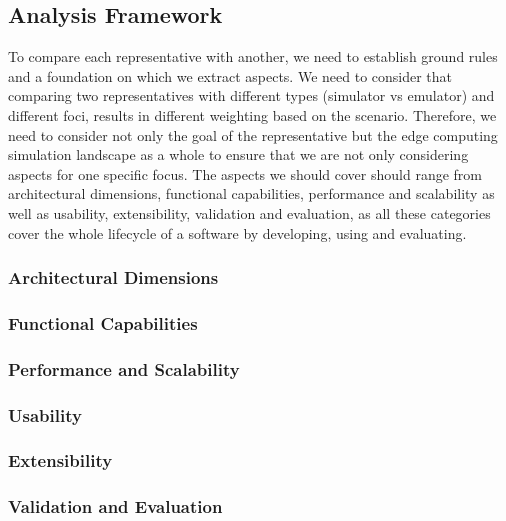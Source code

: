\subsection{Analysis Framework}
To compare each representative with another, we need to establish ground rules and a foundation on which we extract aspects.
We need to consider that comparing two representatives with different types (simulator vs emulator) and different foci, results in different weighting based on the scenario.
Therefore, we need to consider not only the goal of the representative but the edge computing simulation landscape as a whole to ensure that we are not only considering aspects for one specific focus.
The aspects we should cover should range from architectural dimensions, functional capabilities, performance and scalability as well as usability, extensibility, validation and evaluation,
as all these categories cover the whole lifecycle of a software by developing, using and evaluating.

\subsubsection{Architectural Dimensions}

\subsubsection{Functional Capabilities}

\subsubsection{Performance and Scalability}

\subsubsection{Usability}

\subsubsection{Extensibility}

\subsubsection{Validation and Evaluation}

